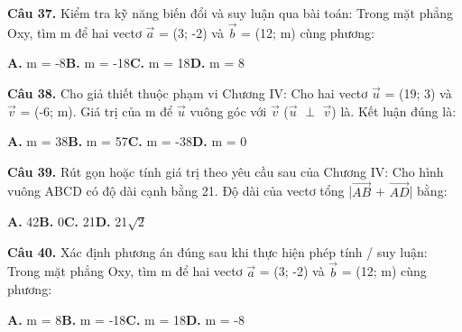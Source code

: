 \documentclass[11pt,a4paper]{article}
\begin{document}
\textbf{\color{primary} Câu 37.} Kiểm tra kỹ năng biến đổi và suy luận qua bài toán: Trong mặt phẳng Oxy, tìm m để hai vectơ $\vec{a}$ = (3; -2) và $\vec{b}$ = (12; m) cùng phương:\par
\hspace*{1.5em}\textbf{A.} m = -8\quad\quad \textbf{B.} m = -18\quad\quad \textbf{C.} m = 18\quad\quad \textbf{D.} m = 8\par\vspace{2pt}
\textbf{\color{primary} Câu 38.} Cho giả thiết thuộc phạm vi Chương IV: Cho hai vectơ $\vec{u}$ = (19; 3) và $\vec{v}$ = (-6; m). Giá trị của m để $\vec{u}$ vuông góc với $\vec{v}$ ($\vec{u}$ $\perp$ $\vec{v}$) là. Kết luận đúng là:\par
\hspace*{1.5em}\textbf{A.} m = 38\quad\quad \textbf{B.} m = 57\quad\quad \textbf{C.} m = -38\quad\quad \textbf{D.} m = 0\par\vspace{2pt}
\textbf{\color{primary} Câu 39.} Rút gọn hoặc tính giá trị theo yêu cầu sau của Chương IV: Cho hình vuông ABCD có độ dài cạnh bằng 21. Độ dài của vectơ tổng |$\overrightarrow{AB}$ + $\overrightarrow{AD}$| bằng:\par
\hspace*{1.5em}\textbf{A.} 42\quad\quad \textbf{B.} 0\quad\quad \textbf{C.} 21\quad\quad \textbf{D.} 21$\sqrt{2}$\par\vspace{2pt}
\textbf{\color{primary} Câu 40.} Xác định phương án đúng sau khi thực hiện phép tính / suy luận: Trong mặt phẳng Oxy, tìm m để hai vectơ $\vec{a}$ = (3; -2) và $\vec{b}$ = (12; m) cùng phương:\par
\hspace*{1.5em}\textbf{A.} m = 8\quad\quad \textbf{B.} m = -18\quad\quad \textbf{C.} m = 18\quad\quad \textbf{D.} m = -8\par\vspace{2pt}
\end{document}
